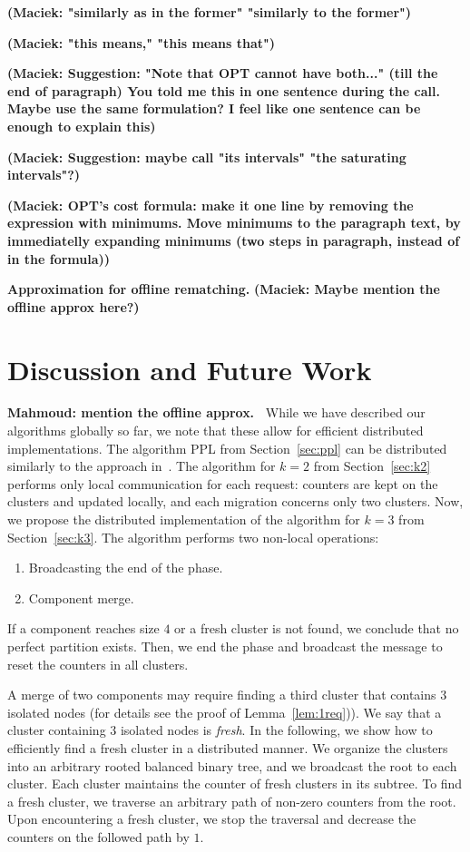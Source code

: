 \documentclass[a4paper,anonymous,USenglish]{lipics-v2019}
\newcommand{\OPT}{\textsc{OPT}\xspace}
\newcommand\mahmoud[1]{\color{orange}\textbf{Mahmoud: #1~}\color{black}}
\newcommand\maciek[1]{\color{brown}\textbf{(Maciek: #1)}\color{black}}
\begin{document}
\maciek{"similarly as in the former" "\textbf{similarly to the former}"}


\maciek{"this means," "\textbf{this means that}"}

\maciek{Suggestion: "Note that \OPT cannot have both..." (till the end of paragraph) You told me this in one sentence during the call. Maybe use the same formulation? I feel like one sentence can be enough to explain this}

\maciek{Suggestion: maybe call "its intervals" "\textbf{the saturating intervals}"?}

\maciek{OPT's cost formula: make it one line by removing the expression with minimums. Move minimums to the paragraph text, by immediatelly expanding minimums (two steps in paragraph, instead of in the formula)}


\noindent
\textbf{Approximation for offline rematching.}
\maciek{Maybe mention the offline approx here?}

\section{Discussion and Future Work}

\mahmoud{mention the offline approx.}
While we have described our algorithms globally so far, we note that these allow for efficient distributed implementations. 
The algorithm PPL from Section~\ref{sec:ppl} can be distributed
similarly to the approach in~\cite{sigmetrics19_partitioning}.
The algorithm for $k=2$ from Section~\ref{sec:k2} performs only local communication for each request: counters are kept on the clusters and updated locally, and each migration concerns only two clusters.
\medskip
Now, we propose the distributed implementation of the algorithm for $k=3$ from Section~\ref{sec:k3}.
The algorithm performs two non-local operations:
\begin{enumerate}
	\item Broadcasting the end of the phase.\label{it:broadcast}
	\item Component merge.
	\label{it:merge}
\end{enumerate}

If a component reaches size $4$ or a fresh cluster is not found, we conclude that no perfect partition exists.
Then, we end the phase and broadcast the message to  reset the counters in all clusters.

A merge of two components may require finding a third cluster that contains $3$ isolated nodes (for details see the proof of Lemma~\ref{lem:1req})).
We say that a cluster containing $3$ isolated nodes is \emph{fresh}.
In the following, we show how to efficiently find a fresh cluster in a distributed manner.
We organize the clusters into an arbitrary rooted balanced binary tree, and we broadcast the root to each cluster.
Each cluster maintains the counter of fresh clusters in its subtree.
To find a fresh cluster, we traverse an arbitrary path of non-zero counters from the root.
Upon encountering a fresh cluster, we stop the traversal and decrease the counters on the followed path by $1$.
\end{document}
